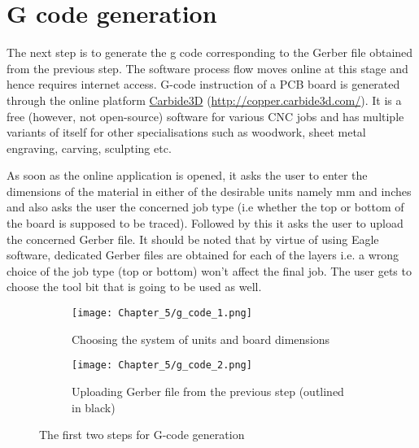 \section{G code generation} \label{gcodegen}

The next step is to generate the g code corresponding to the Gerber file obtained from the previous step. The software process flow moves online at this stage and hence requires internet access. G-code instruction of a PCB board is generated through the online platform \href{http://copper.carbide3d.com/}{Carbide3D} (\url{http://copper.carbide3d.com/}). It is a free (however, not open-source) software for various CNC jobs and has multiple variants of itself for other specialisations such as woodwork, sheet metal engraving, carving, sculpting etc. \par

As soon as the online application is opened, it asks the user to enter the dimensions of the material in either of the desirable units namely mm and inches and also asks the user the concerned job type (i.e whether the top or bottom of the board is supposed to be traced). Followed by this it asks the user to upload the concerned Gerber file. It should be noted that by virtue of using Eagle software, dedicated Gerber files are obtained for each of the layers i.e. a wrong choice of the job type (top or bottom) won’t affect the final job. The user gets to choose the tool bit that is going to be used as well. \par

\begin{figure}[h]
    \begin{subfigure}{0.5\textwidth}
    \texttt{[image: Chapter\_5/g\_code\_1.png]}
    \caption{Choosing the system of units and board dimensions}
    \label{fig:g1}
    \end{subfigure}
    \begin{subfigure}{0.5\textwidth}
    \texttt{[image: Chapter\_5/g\_code\_2.png]}
    \caption{Uploading Gerber file from the previous step (outlined in black)}
    \label{fig:g2}
    \end{subfigure}
    \caption{The first two steps for G-code generation}
    \label{fig:g12}
\end{figure}

